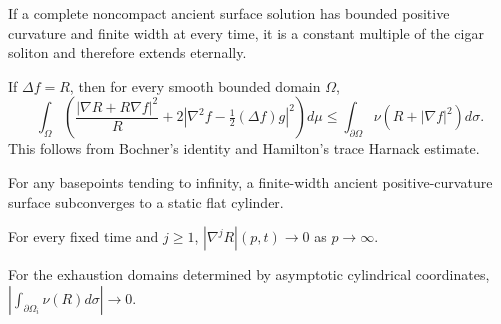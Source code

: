 \begin{theorem}
\label{thm:chow-iv-finite-width-classification}
If a complete noncompact ancient surface solution has bounded positive
curvature and finite width at every time, it is a constant multiple of the
cigar soliton and therefore extends eternally.
\end{theorem}

\begin{lemma}
\label{lem:chow-iv-bochner-inequality}
If \(\Delta f=R\), then for every smooth bounded domain \(\Omega\),
\[
\int_\Omega\left(\frac{|\nabla R+R\nabla f|^2}{R}
 +2\left|\nabla^2f-\tfrac12(\Delta f)g\right|^2\right)d\mu
\le\int_{\partial\Omega}\nu(R+|\nabla f|^2)d\sigma.
\]
This follows from Bochner's identity and Hamilton's trace Harnack estimate.
\end{lemma}

\begin{lemma}
\label{lem:chow-iv-asymptotically-cylindrical}
For any basepoints tending to infinity, a finite-width ancient positive-curvature
surface subconverges to a static flat cylinder.
\end{lemma}

\begin{lemma}
\label{lem:chow-iv-curvature-derivatives-decay}
For every fixed time and \(j\ge1\), \(|\nabla^jR|(p,t)\to0\) as \(p\to\infty\).
\end{lemma}

\begin{lemma}
\label{lem:chow-iv-first-boundary-term}
For the exhaustion domains determined by asymptotic cylindrical coordinates,
\(\left|\int_{\partial\Omega_i}\nu(R)d\sigma\right|\to0\).
\end{lemma}

